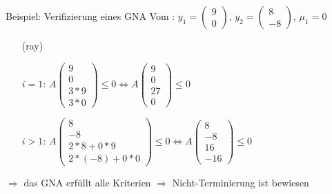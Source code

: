 \begin{frame}
	\begin{exampleblock}{Beispiel: Verifizierung eines GNA }
		Vom \solver: $y_1=\begin{pmatrix} 9 \\ 0 \end{pmatrix}$, $y_2=\begin{pmatrix} 8 \\ -8 \end{pmatrix}$, $\mu_1=0$\newline
		\begin{itemize}
			\setlength{\itemindent}{0.5cm}
			\item[(ray)]
			\item[$i=1$:]  $A\begin{pmatrix} 9 \\ 0 \\ 3*9 \\ 3*0 \end{pmatrix} \le 0 \Leftrightarrow A\begin{pmatrix} 9 \\ 0 \\ 27 \\ 0 \end{pmatrix} \le 0$ \checkmark
			\item[$i>1$:] $A\begin{pmatrix} 8 \\ -8 \\ 2*8+0*9 \\ 2*(-8)+0*0 \end{pmatrix} \le 0 \Leftrightarrow A\begin{pmatrix} 8 \\ -8 \\ 16 \\ -16 \end{pmatrix} \le 0$ \checkmark
		\end{itemize}
		$\Rightarrow$ das GNA erf\"ullt alle Kriterien\newline
		$\Rightarrow$ Nicht-Terminierung ist bewiesen
	\end{exampleblock}
\end{frame}






